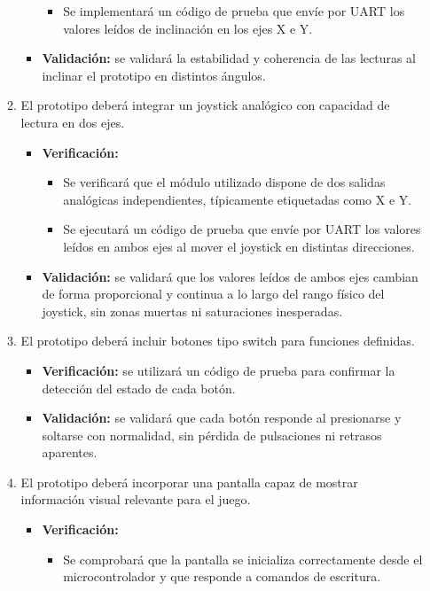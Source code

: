 \documentclass[
11pt, %
]{charter}
\begin{document}
\begin{enumerate}
\begin{enumerate}
\begin{itemize}
\begin{itemize}
				\item Se implementará un código de prueba que envíe por UART los valores leídos de inclinación en los ejes X e Y.
			\end{itemize}
			\item \textbf{Validación:} se validará la estabilidad y coherencia de las lecturas al inclinar el prototipo en distintos ángulos.
		\end{itemize}		
		\item El prototipo deberá integrar un joystick analógico con capacidad de lectura en dos ejes. %
		\begin{itemize}
			\item \textbf{Verificación:} 
			\begin{itemize}
				\item Se verificará que el módulo utilizado dispone de dos salidas analógicas independientes, típicamente etiquetadas como X e Y.                                     
				\item Se ejecutará un código de prueba que envíe por UART los valores leídos en ambos ejes al mover el joystick en distintas direcciones.
			\end{itemize}
			\item \textbf{Validación:} se validará que los valores leídos de ambos ejes cambian de forma proporcional y continua a lo largo del rango físico del joystick, sin zonas muertas ni saturaciones inesperadas.
		\end{itemize}
		\item El prototipo deberá incluir botones tipo switch para funciones definidas. %
		\begin{itemize}
			\item \textbf{Verificación:} se utilizará un código de prueba para confirmar la detección del estado de cada botón.
			\item \textbf{Validación:} se validará que cada botón responde al presionarse y soltarse con normalidad, sin pérdida de pulsaciones ni retrasos aparentes.
		\end{itemize}		
		\item El prototipo deberá incorporar una pantalla capaz de mostrar información visual relevante para el juego. %
		\begin{itemize}
			\item \textbf{Verificación:} 
			\begin{itemize}
				\item Se comprobará que la pantalla se inicializa correctamente desde el microcontrolador y que responde a comandos de escritura.                                     

\end{itemize}
\end{itemize}
\end{enumerate}
\end{enumerate}
\end{document}
